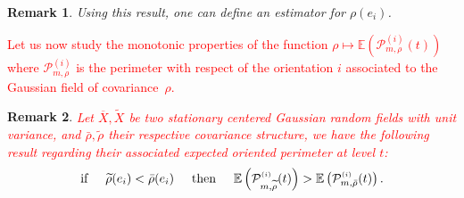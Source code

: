 \documentclass[12pt]{article}
\renewcommand{\tilde}{\widetilde}
\theoremstyle{Theorem}
\newtheorem{remark}{Remark}
\begin{document}
\begin{remark}
Using this result, one can define an estimator for $\rho(e_i)$. 
\end{remark}
\textcolor{red}{Let us now study the monotonic properties of the function $\rho \mapsto \mathbb{E}\left(\mathcal{P}^{\scriptscriptstyle (i)}_{m, \rho}(t)\right)$ where $\mathcal{P}^{\scriptscriptstyle (i)}_{m, \rho}$ is the perimeter with respect of the orientation $i$ associated to the Gaussian field of covariance~$\rho$.}
\begin{remark}
\label{powertest}
\textcolor{red}{Let $\overline{X}, \tilde{X}$ be two stationary centered Gaussian random fields with unit variance, and $\bar{\rho}, \tilde{\rho}$ their respective covariance structure, we  have the following result regarding their associated expected oriented perimeter at level $t$:}
\begin{equation*}
 \text{if} \hspace{0.5cm} \tilde{\rho}(e_i) < \bar{\rho}(e_i) \hspace{0.5cm} \text{then} \hspace{0.5cm}\mathbb{E}\left(\mathcal{P}^{\scriptscriptstyle (i)}_{m, \tilde{\rho}}(t)\right) > \mathbb{E}\left(\mathcal{P}^{\scriptscriptstyle (i)}_{m, \bar{\rho}}(t)\right).
\end{equation*}
\end{remark}
\end{document}
